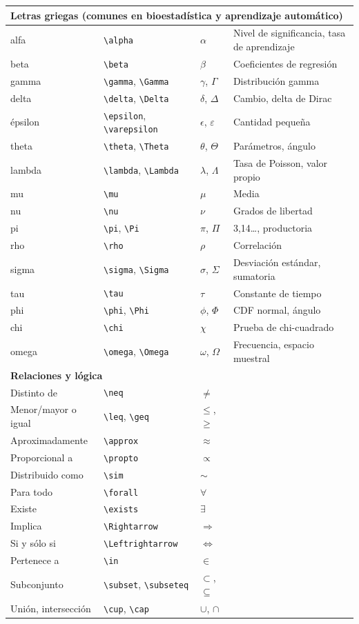 \begin{longtable}{p{3.2cm} p{4.5cm} p{3.0cm} p{3.5cm}}
\multicolumn{4}{l}{\textbf{Letras griegas (comunes en bioestadística y aprendizaje automático)}} \\
\midrule
alfa & \verb|\alpha| & $\alpha$ & Nivel de significancia, tasa de aprendizaje \\
beta & \verb|\beta| & $\beta$ & Coeficientes de regresión \\
gamma & \verb|\gamma|, \verb|\Gamma| & $\gamma$, $\Gamma$ & Distribución gamma \\
delta & \verb|\delta|, \verb|\Delta| & $\delta$, $\Delta$ & Cambio, delta de Dirac \\
épsilon & \verb|\epsilon|, \verb|\varepsilon| & $\epsilon$, $\varepsilon$ & Cantidad pequeña \\
theta & \verb|\theta|, \verb|\Theta| & $\theta$, $\Theta$ & Parámetros, ángulo \\
lambda & \verb|\lambda|, \verb|\Lambda| & $\lambda$, $\Lambda$ & Tasa de Poisson, valor propio \\
mu & \verb|\mu| & $\mu$ & Media \\
nu & \verb|\nu| & $\nu$ & Grados de libertad \\
pi & \verb|\pi|, \verb|\Pi| & $\pi$, $\Pi$ & 3{,}14\ldots, productoria \\
rho & \verb|\rho| & $\rho$ & Correlación \\
sigma & \verb|\sigma|, \verb|\Sigma| & $\sigma$, $\Sigma$ & Desviación estándar, sumatoria \\
tau & \verb|\tau| & $\tau$ & Constante de tiempo \\
phi & \verb|\phi|, \verb|\Phi| & $\phi$, $\Phi$ & CDF normal, ángulo \\
chi & \verb|\chi| & $\chi$ & Prueba de chi-cuadrado \\
omega & \verb|\omega|, \verb|\Omega| & $\omega$, $\Omega$ & Frecuencia, espacio muestral \\
\midrule

\multicolumn{4}{l}{\textbf{Relaciones y lógica}} \\
\midrule
Distinto de & \verb|\neq| & $\neq$ & \\
Menor/mayor o igual & \verb|\leq|, \verb|\geq| & $\leq$, $\geq$ & \\
Aproximadamente & \verb|\approx| & $\approx$ & \\
Proporcional a & \verb|\propto| & $\propto$ & \\
Distribuido como & \verb|\sim| & $\sim$ & \\
Para todo & \verb|\forall| & $\forall$ & \\
Existe & \verb|\exists| & $\exists$ & \\
Implica & \verb|\Rightarrow| & $\Rightarrow$ & \\
Si y sólo si & \verb|\Leftrightarrow| & $\Leftrightarrow$ & \\
Pertenece a & \verb|\in| & $\in$ & \\
Subconjunto & \verb|\subset|, \verb|\subseteq| & $\subset$, $\subseteq$ & \\
Unión, intersección & \verb|\cup|, \verb|\cap| & $\cup$, $\cap$ & \\
\midrule


\end{longtable}
